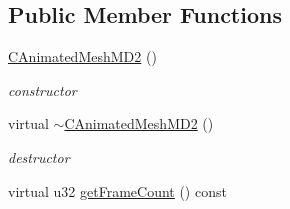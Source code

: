 \subsection*{Public Member Functions}
\begin{DoxyCompactItemize}
\item 
\hypertarget{classirr_1_1scene_1_1_c_animated_mesh_m_d2_a0c36f64b47f01e2699f0a91dcfd448ba}{\hyperlink{classirr_1_1scene_1_1_c_animated_mesh_m_d2_a0c36f64b47f01e2699f0a91dcfd448ba}{C\-Animated\-Mesh\-M\-D2} ()}\label{classirr_1_1scene_1_1_c_animated_mesh_m_d2_a0c36f64b47f01e2699f0a91dcfd448ba}

\begin{DoxyCompactList}\small\item\em constructor \end{DoxyCompactList}\item 
\hypertarget{classirr_1_1scene_1_1_c_animated_mesh_m_d2_a58debceb9f1001a13ae44ecdc6f49da0}{virtual \hyperlink{classirr_1_1scene_1_1_c_animated_mesh_m_d2_a58debceb9f1001a13ae44ecdc6f49da0}{$\sim$\-C\-Animated\-Mesh\-M\-D2} ()}\label{classirr_1_1scene_1_1_c_animated_mesh_m_d2_a58debceb9f1001a13ae44ecdc6f49da0}

\begin{DoxyCompactList}\small\item\em destructor \end{DoxyCompactList}\item 
\hypertarget{classirr_1_1scene_1_1_c_animated_mesh_m_d2_afe2a22bac05a8a80eec11fc9d7cdaa05}{virtual u32 \hyperlink{classirr_1_1scene_1_1_c_animated_mesh_m_d2_afe2a22bac05a8a80eec11fc9d7cdaa05}{get\-Frame\-Count} () const }\label{classirr_1_1scene_1_1_c_animated_mesh_m_d2_afe2a22bac05a8a80eec11fc9d7cdaa05}


\end{DoxyCompactItemize}

